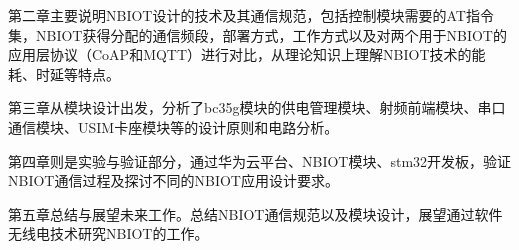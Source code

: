 第二章主要说明NBIOT设计的技术及其通信规范，包括控制模块需要的AT指令集，NBIOT获得分配的通信频段，部署方式，工作方式以及对两个用于NBIOT的应用层协议（CoAP和MQTT）进行对比，从理论知识上理解NBIOT技术的能耗、时延等特点。

第三章从模块设计出发，分析了bc35g模块的供电管理模块、射频前端模块、串口通信模块、USIM卡座模块等的设计原则和电路分析。

第四章则是实验与验证部分，通过华为云平台、NBIOT模块、stm32开发板，验证NBIOT通信过程及探讨不同的NBIOT应用设计要求。

第五章总结与展望未来工作。总结NBIOT通信规范以及模块设计，展望通过软件无线电技术研究NBIOT的工作。
